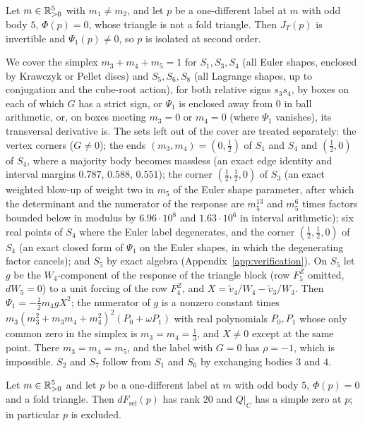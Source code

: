 \begin{lemma}\label{lem:d2-P}
Let $m\in\mathbb{R}_{>0}^5$ with $m_1\ne m_2$, and let $p$ be a one-different label at $m$ with odd body $5$,
$\Phi(p)=0$, whose triangle is not a fold triangle.  Then $J_T(p)$ is invertible and
$\Psi_1(p)\ne0$, so $p$ is isolated at second order.
\end{lemma}

We cover the simplex $m_3+m_4+m_5=1$ for $S_1,S_3,S_4$ (all Euler shapes, enclosed
by Krawczyk or Pellet discs) and $S_5,S_6,S_8$ (all Lagrange shapes, up to conjugation and the
cube-root action), for both relative signs $s_3s_4$, by boxes on each of which $G$ has a strict
sign, or $\Psi_1$ is enclosed away from $0$ in ball arithmetic, or, on boxes meeting $m_3=0$ or
$m_4=0$ (where $\Psi_1$ vanishes), its transversal derivative is.  The sets left out of the cover
are treated separately: the vertex corners ($G\ne0$); the ends $(m_3,m_4)=(0,\frac12)$ of $S_1$
and $S_4$ and $(\frac12,0)$ of $S_4$, where a majority body becomes massless (an exact edge
identity and interval margins $0.787$, $0.588$, $0.551$); the corner $(\frac12,\frac12,0)$ of
$S_3$ (an exact weighted blow-up of weight two in $m_5$ of the Euler shape parameter, after which
the determinant and the numerator of the response are $m_5^{13}$ and $m_5^6$ times factors bounded
below in modulus by $6.96\cdot10^8$ and $1.63\cdot10^6$ in interval arithmetic); six real points
of $S_4$ where the Euler label degenerates, and the corner $(\frac12,\frac12,0)$ of $S_4$ (an
exact closed form of $\Psi_1$ on the Euler shapes, in which the degenerating factor cancels); and
$S_5$ by exact algebra (Appendix~\ref{app:verification}).  On $S_5$ let $g$ be the
$W_4$-component of the response of the triangle block (row $F^Z_5$ omitted, $dW_5=0$) to a unit
forcing of the row $F^Z_4$, and $X=\tilde v_4/W_4-\tilde v_3/W_3$.  Then
$\Psi_1=-\frac12m_4gX^2$; the numerator of $g$ is a nonzero constant times
$m_3(m_3^2+m_3m_4+m_4^2)^2(P_0+\omega P_1)$ with real polynomials $P_0,P_1$ whose only common zero
in the simplex is $m_3=m_4=\frac13$, and $X\ne0$ except at the same point.  There $m_3=m_4=m_5$,
and the label with $G=0$ has $\rho=-1$, which is impossible.  $S_2$ and $S_7$ follow from $S_1$
and $S_6$ by exchanging bodies $3$ and $4$.

\begin{lemma}\label{lem:d2-fold}
Let $m\in\mathbb{R}_{>0}^5$ and let $p$ be a one-different label at $m$ with odd body $5$, $\Phi(p)=0$ and a
fold triangle.  Then $dF_{\mathrm{sel}}(p)$ has rank $20$ and $Q|_C$ has a simple zero at $p$; in
particular $p$ is excluded.
\end{lemma}

